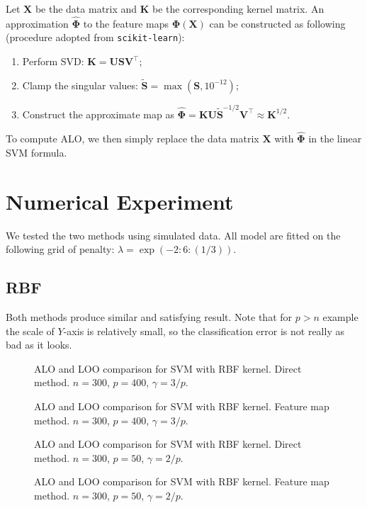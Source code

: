 \documentclass[11pt]{article}
\newcommand{\bK}{\bm{K}}
\newcommand{\bX}{\bm{X}}
\newcommand{\bPhi}{\bm{\Phi}}
\begin{document}
Let \(\bX\) be the data matrix and \(\bK\) be the corresponding kernel matrix. An approximation \(\hat{\bPhi}\) to the feature maps \(\bPhi(\bX)\) can be constructed as following (procedure adopted from \verb|scikit-learn|):
	\begin{enumerate}
		\item Perform SVD: \(\bK=\bm{U}\bm{S}\bm{V}^\top\);
		\item Clamp the singular values: \(\tilde{\bm{S}}=\max(\bm{S}, 10^{-12})\);
		\item Construct the approximate map as \(\hat{\bPhi}=\bK\bm{U}\tilde{\bm{S}}^{-1/2}\bm{V}^\top\approx\bK^{1/2}\).
	\end{enumerate}
To compute ALO, we then simply replace the data matrix \(\bX\) with \(\hat{\bPhi}\) in the linear SVM formula.

\section{Numerical Experiment}
We tested the two methods using simulated data. All model are fitted on the following grid of penalty: \(\lambda=\exp(-2:6:(1/3))\).
\subsection{RBF}
Both methods produce similar and satisfying result. Note that for \(p>n\) example the scale of \(Y\)-axis is relatively small, so the classification error is not really as bad as it looks.
\begin{figure}[H]
	\centering
	
	\caption{ALO and LOO comparison for SVM with RBF kernel. Direct method. \(n=300\), \(p=400\), \(\gamma=3/p\).}
\end{figure}
\begin{figure}[H]
	\centering
	
	\caption{ALO and LOO comparison for SVM with RBF kernel. Feature map method. \(n=300\), \(p=400\), \(\gamma=3/p\).}
\end{figure}
\begin{figure}[H]
	\centering
	
	\caption{ALO and LOO comparison for SVM with RBF kernel. Direct method. \(n=300\), \(p=50\), \(\gamma=2/p\).}
\end{figure}
\begin{figure}[H]
	\centering
	
	\caption{ALO and LOO comparison for SVM with RBF kernel. Feature map method. \(n=300\), \(p=50\), \(\gamma=2/p\).}
\end{figure}
\end{document}
